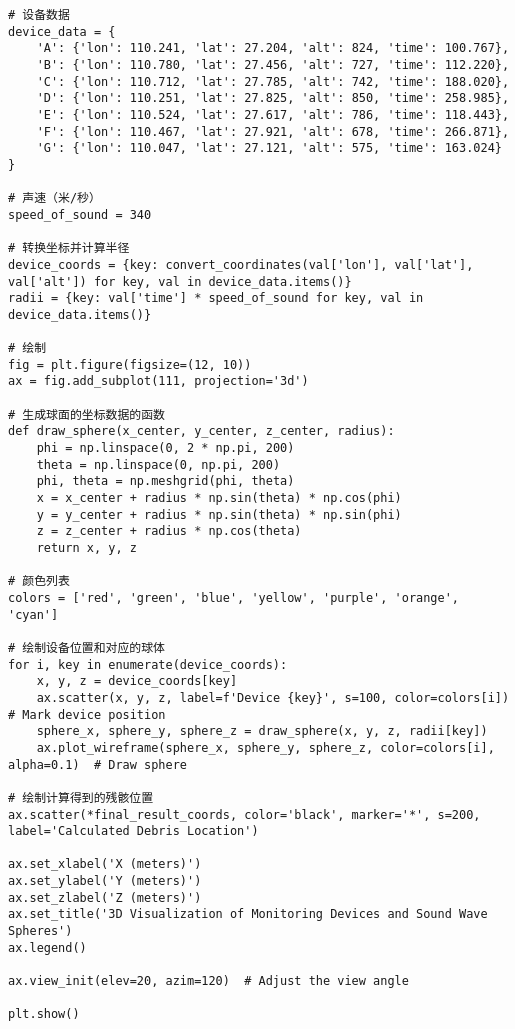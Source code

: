 \documentclass[withoutpreface,bwprint,12pt,a4paper]{cumcmthesis}
\begin{document}
\begin{appendices}
\begin{lstlisting}
# 设备数据
device_data = {
    'A': {'lon': 110.241, 'lat': 27.204, 'alt': 824, 'time': 100.767},
    'B': {'lon': 110.780, 'lat': 27.456, 'alt': 727, 'time': 112.220},
    'C': {'lon': 110.712, 'lat': 27.785, 'alt': 742, 'time': 188.020},
    'D': {'lon': 110.251, 'lat': 27.825, 'alt': 850, 'time': 258.985},
    'E': {'lon': 110.524, 'lat': 27.617, 'alt': 786, 'time': 118.443},
    'F': {'lon': 110.467, 'lat': 27.921, 'alt': 678, 'time': 266.871},
    'G': {'lon': 110.047, 'lat': 27.121, 'alt': 575, 'time': 163.024}
}

# 声速（米/秒）
speed_of_sound = 340

# 转换坐标并计算半径
device_coords = {key: convert_coordinates(val['lon'], val['lat'], val['alt']) for key, val in device_data.items()}
radii = {key: val['time'] * speed_of_sound for key, val in device_data.items()}

# 绘制
fig = plt.figure(figsize=(12, 10))
ax = fig.add_subplot(111, projection='3d')

# 生成球面的坐标数据的函数
def draw_sphere(x_center, y_center, z_center, radius):
    phi = np.linspace(0, 2 * np.pi, 200)
    theta = np.linspace(0, np.pi, 200)
    phi, theta = np.meshgrid(phi, theta)
    x = x_center + radius * np.sin(theta) * np.cos(phi)
    y = y_center + radius * np.sin(theta) * np.sin(phi)
    z = z_center + radius * np.cos(theta)
    return x, y, z

# 颜色列表
colors = ['red', 'green', 'blue', 'yellow', 'purple', 'orange', 'cyan']

# 绘制设备位置和对应的球体
for i, key in enumerate(device_coords):
    x, y, z = device_coords[key]
    ax.scatter(x, y, z, label=f'Device {key}', s=100, color=colors[i])  # Mark device position
    sphere_x, sphere_y, sphere_z = draw_sphere(x, y, z, radii[key])
    ax.plot_wireframe(sphere_x, sphere_y, sphere_z, color=colors[i], alpha=0.1)  # Draw sphere

# 绘制计算得到的残骸位置
ax.scatter(*final_result_coords, color='black', marker='*', s=200, label='Calculated Debris Location')

ax.set_xlabel('X (meters)')
ax.set_ylabel('Y (meters)')
ax.set_zlabel('Z (meters)')
ax.set_title('3D Visualization of Monitoring Devices and Sound Wave Spheres')
ax.legend()

ax.view_init(elev=20, azim=120)  # Adjust the view angle

plt.show()

 \end{lstlisting}


\end{appendices}
\end{document}
